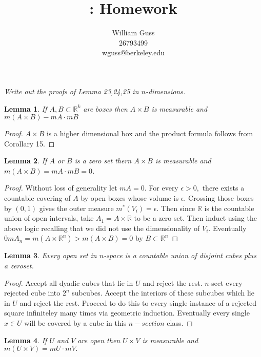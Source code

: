 \documentclass[letter]{article}
\title{\bCLASS: Homework \bHWN}
\author{William Guss\\26793499\\wguss@berkeley.edu}
\newtheorem{lemma}{Lemma}
\newenvironment{menumerate}{%
  \edef\backupindent{\the\parindent}%
  \enumerate%
  \setlength{\parindent}{\backupindent}%
}{\endenumerate}
\begin{document}
\maketitle
\thispagestyle{empty}

\begin{menumerate}
    \setcounter{enumi}{15}
    \item  \emph{Write out the proofs of Lemma 23,24,25 in $n$-dimensions.}
    \begin{lemma}
        If $A,B \subset \mathbb{R}^k$ are boxes then $A \times B$ is measurable and $m(A \times B) - mA \cdot mB$
    \end{lemma}
    \begin{proof}
        $A \times B$ is a higher dimensional box and the product formula follows from Corollary 15.
    \end{proof}
    \begin{lemma}
        If $A$ or $B$ is a zero set thern $A \times B$ is measurable and $m(A \times B) = mA \cdot mB = 0$. 
    \end{lemma}
    \begin{proof}
        Without loss of generality let $mA = 0$. For every $\epsilon > 0,$ there exists a countable covering of $A$ by open boxes whose volume is
        $\epsilon.$ Crossing those boxes by $(0,1)$ gives the outer measure $m^*(V_i) = \epsilon.$ Then since $\mathbb{R}$ is the countable union of 
        open intervals, take $A_1 = A \times \mathbb{R}$ to be a zero set. Then induct using the above logic recalling that we did not use the dimensionality
        of $V_i.$ Eventually $0 mA_n =m(A \times \mathbb{R}^n) > m(A \times B) = 0$ by $B \subset \mathbb{R}^n$
    \end{proof}
    \begin{lemma}
        Every open set in $n$-space is a countable union of disjoint cubes plus a zeroset. 
    \end{lemma}
    \begin{proof}
        Accept all dyadic cubes that lie in $U$ and reject the rest. $n$-sect every rejected cube into $2^n$ subcubes. Accept 
        the interiors of these subcubes which lie in $U$ and reject the rest. Proceed to do this to every single instance of a rejected square infiniteley
        many times via geometric induction. Eventually every single $x \in U$ will be covered by a cube in this $n-section$ class.
    \end{proof}
    \begin{lemma}
        If $U$ and $V$ are open then $U \times V$ is measurable and $m(U \times V) = mU\cdot mV.$   

\end{lemma}
\end{menumerate}
\end{document}
